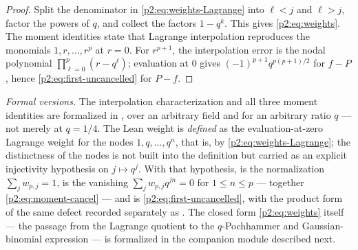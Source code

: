 \documentclass[11pt,oneside]{article}
\numberwithin{equation}{section}
\theoremstyle{definition}
\theoremstyle{remark}
\begin{document}
\begin{proof}
Split the denominator in \eqref{p2:eq:weights-Lagrange} into $\ell<j$ and $\ell>j$, factor the
powers of $q$, and collect the factors $1-q^k$.  This gives \eqref{p2:eq:weights}.  The moment
identities state that Lagrange interpolation reproduces the monomials $1,r,\ldots,r^p$ at
$r=0$.  For $r^{p+1}$, the interpolation error is the nodal polynomial
$\prod_{\ell=0}^{p}(r-q^\ell)$; evaluation at $0$ gives
$(-1)^{p+1}q^{p(p+1)/2}$ for $f-P$, hence \eqref{p2:eq:first-uncancelled} for $P-f$.
\end{proof}

\emph{Formal versions.}  The interpolation characterization and all three moment identities
are formalized in , over an arbitrary field and for an arbitrary
ratio $q$ --- not merely at $q=1/4$.  The Lean weight
 is \emph{defined} as the evaluation-at-zero Lagrange
weight for the nodes $1,q,\ldots,q^n$, that is, by \eqref{p2:eq:weights-Lagrange}; the
distinctness of the nodes is not built into the definition but carried as an explicit
injectivity hypothesis on $j\mapsto q^j$.  With that hypothesis,
 is the normalization $\sum_jw_{p,j}=1$,
 is the vanishing
$\sum_jw_{p,j}q^{jn}=0$ for $1\le n\le p$ --- together \eqref{p2:eq:moment-cancel} --- and
 is
\eqref{p2:eq:first-uncancelled}, with the product form of the same defect recorded separately as
.  The closed form
\eqref{p2:eq:weights} itself --- the passage from the Lagrange quotient to the $q$-Pochhammer
and Gaussian-binomial expression --- is formalized in the companion module described next.
\end{document}
